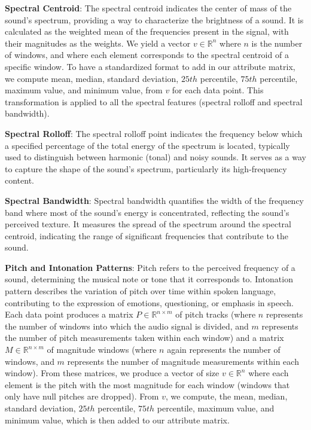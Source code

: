 \documentclass[twocolumn]{article}
\newcommand{\R}{\mathbb{R}}
\begin{document}
\textbf{Spectral Centroid}: The spectral centroid indicates the center of mass of the sound's spectrum, providing a way to characterize the brightness of a sound. It is calculated as the weighted mean of the frequencies present in the signal, with their magnitudes as the weights. We yield a vector $v \in \R^{n}$ where $n$ is the number of windows, and where each element corresponds to the spectral centroid of a specific window. To have a standardized format to add in our attribute matrix, we compute mean, median, standard deviation, $25th$ percentile, $75th$ percentile, maximum value, and minimum value, from $v$ for each data point. This transformation is applied to all the spectral features (spectral rolloff and spectral bandwidth). 

\textbf{Spectral Rolloff}: The spectral rolloff point indicates the frequency below which a specified percentage of the total energy of the spectrum is located, typically used to distinguish between harmonic (tonal) and noisy sounds. It serves as a way to capture the shape of the sound's spectrum, particularly its high-frequency content.

\textbf{Spectral Bandwidth}: Spectral bandwidth quantifies the width of the frequency band where most of the sound's energy is concentrated, reflecting the sound's perceived texture. It measures the spread of the spectrum around the spectral centroid, indicating the range of significant frequencies that contribute to the sound.

\textbf{Pitch and Intonation Patterns}: Pitch refers to the perceived frequency of a sound, determining the musical note or tone that it corresponds to. Intonation pattern describes the variation of pitch over time within spoken language, contributing to the expression of emotions, questioning, or emphasis in speech. Each data point produces a matrix $P \in \R^{n \times m}$ of pitch tracks (where $n$ represents the number of windows into which the audio signal is divided, and $m$ represents the number of pitch measurements taken within each window) and a matrix $M \in \R^{n \times m}$ of magnitude windows (where $n$ again represents the number of windows, and $m$ represents the number of magnitude measurements within each window). From these matrices, we produce a vector of size $v \in \R^{n}$ where each element is the pitch with the most magnitude for each window (windows that only have null pitches are dropped). From $v$, we compute, the mean, median, standard deviation, $25th$ percentile, $75th$ percentile, maximum value, and minimum value, which is then added to our attribute matrix. 
\end{document}
